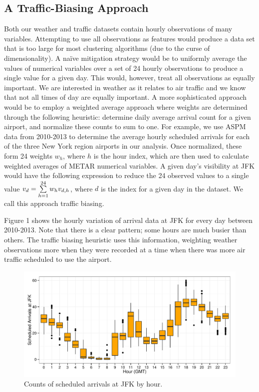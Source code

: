 \documentclass[11pt]{scrartcl}
\begin{document}
\subsection{A Traffic-Biasing Approach}
Both our weather and traffic datasets contain hourly observations of many variables. Attempting to use all observations as features would produce a data set that is too large for most clustering algorithms (due to the curse of dimensionality).  A na{\"i}ve mitigation strategy would be to uniformly average the values of numerical variables over a set of 24 hourly observations to produce a single value for a given day.  This would, however, treat all observations as equally important.  We are interested in weather as it relates to air traffic and we know that not all times of day are equally important.  A more sophisticated approach would be to employ a weighted average approach where weights are determined through the following heuristic: determine daily average arrival count for a given airport, and normalize these counts to sum to one.  For example, we use ASPM data from 2010-2013 to determine the average hourly scheduled arrivals for each of the three New York region airports in our analysis.  Once normalized, these form 24 weights $w_h$, where $h$ is the hour index, which are then used to calculate weighted averages of METAR numerical variables.  A given day's visibility at JFK would have the following expression to reduce the 24 observed values to a single value $v_{d} = \sum_{h=1}^{24}\limits w_h v_{d,h}$, where $d$ is the index for a given day in the dataset.  We call this approach traffic biasing.

Figure 1 shows the hourly variation of arrival data at JFK for every day between 2010-2013.  Note that there is a clear pattern; some hours are much busier than others.  The traffic biasing heuristic uses this information, weighting weather observations more when they were recorded at a time when there was more air traffic scheduled to use the airport.

\begin{figure}[h]
\begin{center}
\includegraphics[scale=0.8125]{./figures/Fig1.pdf}
\caption{Counts of scheduled arrivals at JFK by hour.}
\label{default}
\end{center}
\end{figure}
\end{document}
